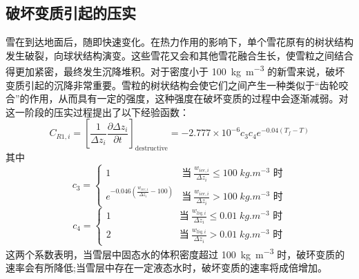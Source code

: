 \subsection{破坏变质引起的压实}
雪在到达地面后，随即快速变化。在热力作用的影响下，单个雪花原有的树状结构发生破裂，向球状结构演变。这些雪花又会和其他雪花融合生长，使雪粒之间结合得更加紧密，最终发生沉降堆积。对于密度小于 \qty{100}{kg.m^{-3}} 的新雪来说，破坏变质引起的沉降非常重要。雪粒的树状结构会使它们之间产生一种类似于“齿轮咬合”的作用，从而具有一定的强度，这种强度在破坏变质的过程中会逐渐减弱。\citet{anderson1976point}对这一阶段的压实过程提出了以下经验函数：
\begin{equation}\label{eq:DestruciveCompact}
C_{R1,i}=\left[\frac{1}{\Delta {z_i}} \frac{\partial \Delta {z_i}}{\partial {t}}\right]_{\text {destructive}}=-2.777 \times 10^{-6} {c}_{3} {c}_{4} {e}^{-0.04\left(T_f-T\right)}
\end{equation}
其中
\begin{equation}
    c_3=\begin{cases}
        1 &\text{当}\ \frac{w_{ice,i}}{\Delta z_i} \leqslant 100 \;\unit{kg.m^{-3}}\text{ 时} \\
        e^{-0.046\left(\frac{w_{ice,i}}{\Delta z_i}-100\right)} &\text{当}\ \frac{w_{ice,i}}{\Delta z_i}>100 \;\unit{kg.m^{-3}}\text{ 时}
    \end{cases}
\end{equation}
\begin{equation}
    c_4=\begin{cases}
        1 &\qquad \quad \qquad \quad \;\text{当}\ \frac{w_{liq,i}}{\Delta z_i} \leqslant 0.01 \;\unit{kg.m^{-3}}\text{ 时} \\
        2 &\qquad \quad \qquad \quad \;\text{当}\ \frac{w_{liq,i}}{\Delta z_i}>0.01 \;\unit{kg.m^{-3}}\text{ 时}
    \end{cases}
\end{equation}
这两个系数表明，当雪层中固态水的体积密度超过 \qty{100}{kg.m^{-3}} 时，破环变质的速率会有所降低;当雪层中存在一定液态水时，破坏变质的速率将成倍增加。

